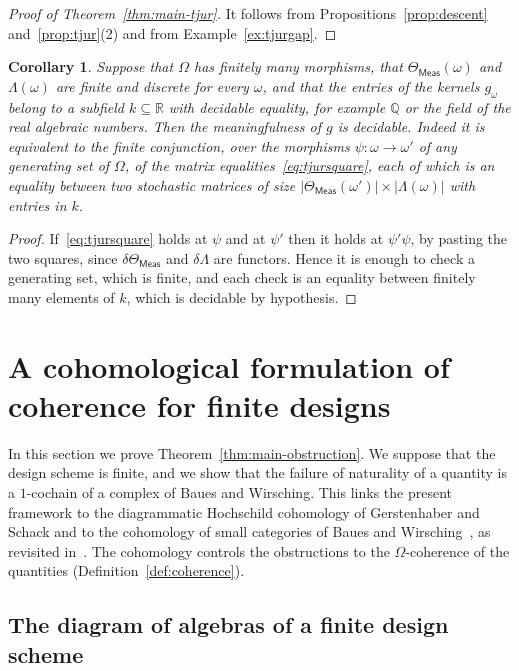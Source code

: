 \documentclass[11pt,a4paper]{article}
\theoremstyle{plain}
\newtheorem{corollary}[theorem]{Corollary}
\theoremstyle{definition}
\theoremstyle{remark}
\newcommand{\cat}[1]{\mathsf{#1}}
\newcommand{\catO}{\cat{\Omega}}
\newcommand{\Meas}{\cat{Meas}}
\newcommand{\del}{\delta}
\newcommand{\R}{\mathbb{R}}
\begin{document}
\begin{proof}[Proof of Theorem~\ref{thm:main-tjur}]
It follows from Propositions~\ref{prop:descent} and~\ref{prop:tjur}(2) and
from Example~\ref{ex:tjurgap}.
\end{proof}

\begin{corollary}\label{cor:decidable}
Suppose that $\catO$ has finitely many morphisms, that
$\Theta_\Meas(\omega)$ and $\Lambda(\omega)$ are finite and discrete for every
$\omega$, and that the entries of the kernels $g_\omega$ belong to a subfield
$k \subseteq \R$ with decidable equality, for example $\mathbb{Q}$ or the
field of the real algebraic numbers. Then the meaningfulness of $g$ is
decidable. Indeed it is equivalent to the finite conjunction, over the
morphisms $\psi \colon \omega \to \omega'$ of any generating set of $\catO$,
of the matrix equalities~\eqref{eq:tjursquare}, each of which is an equality
between two stochastic matrices of size
$|\Theta_\Meas(\omega')| \times |\Lambda(\omega)|$ with entries in $k$.
\end{corollary}

\begin{proof}
If~\eqref{eq:tjursquare} holds at $\psi$ and at $\psi'$ then it holds at
$\psi'\psi$, by pasting the two squares, since $\del\Theta_\Meas$ and
$\del\Lambda$ are functors. Hence it is enough to check a generating set,
which is finite, and each check is an equality between finitely many elements
of $k$, which is decidable by hypothesis.
\end{proof}
\section{A cohomological formulation of coherence for finite
designs}\label{sec:hochschild}

In this section we prove Theorem~\ref{thm:main-obstruction}. We suppose that
the design scheme is finite, and we show that the failure of naturality of a
quantity is a $1$-cochain of a complex of Baues and Wirsching. This links the
present framework to the diagrammatic Hochschild cohomology of Gerstenhaber
and Schack and to the cohomology of small categories of Baues and
Wirsching~\cite{gerstenhaber_schack_1983,baues_cohomology_1985}, as revisited
in~\cite[\S3]{caputi_diagrammatic_2025}. The cohomology controls the
obstructions to the $\catO$-coherence of the quantities
(Definition~\ref{def:coherence}).

\subsection{The diagram of algebras of a finite design scheme}
\end{document}
